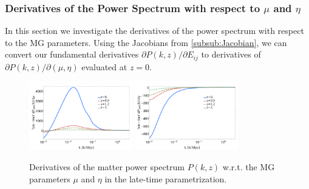 \subsubsection{Derivatives of the Power Spectrum with respect to $\mu$ and $\eta$}\label{sec:appder}

In this section we investigate the derivatives of the power spectrum with respect to the MG parameters. 
Using the Jacobians from \cref{subsub:Jacobian}, we can convert 
our fundamental derivatives $\partial P(k,z)/\partial E_{ij}$ to derivatives of $\partial P(k,z)/\partial (\mu, \eta)$ evaluated at $z=0$.

\begin{figure}[htbp]
	\centering{}
	\includegraphics[width=0.4\textwidth]{Chapters/linear-nonlinear-MG-forecasts/figures/power-spectra/derivs/MGDE-Pk-wrt-mu-4z.pdf}
	\includegraphics[width=0.4\textwidth]{Chapters/linear-nonlinear-MG-forecasts/figures/power-spectra/derivs/MGDE-Pk-wrt-eta-4z.pdf}
	\caption[Derivatives of the power spectrum in the late-time parameterization.]{ Derivatives of the matter power spectrum $P(k,z)$ w.r.t. the MG parameters $\mu$ and $\eta$ in the late-time parametrization.
	}\label{fig:Pkderivs-latetime}
\end{figure}


